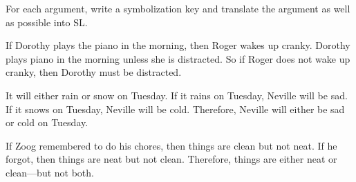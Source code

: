 \problempart
For each argument, write a symbolization key and translate the argument as well as possible into SL.
\begin{earg}
\item If Dorothy plays the piano in the morning, then Roger wakes up cranky. Dorothy plays piano in the morning unless she is distracted. So if Roger does not wake up cranky, then Dorothy must be distracted.

\item It will either rain or snow on Tuesday. If it rains on Tuesday, Neville will be sad. If it snows on Tuesday, Neville will be cold. Therefore, Neville will either be sad or cold on Tuesday.



\item If Zoog remembered to do his chores, then things are clean but not neat. If he forgot, then things are neat but not clean. Therefore, things are either neat or clean---but not both.
\end{earg}


